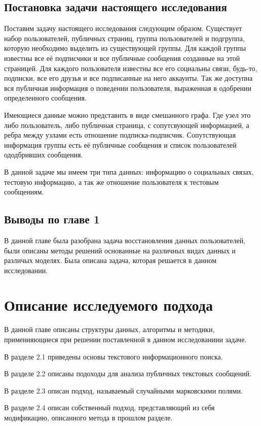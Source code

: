 \documentclass[annotation,times,page4]{itmo-student-thesis}
\begin{document}
\section{Постановка задачи настоящего исследования}
Поставим задачу настоящего исследования следующим образом. Существует набор пользователей, публичных страниц, группа пользователей и подгруппа, которую необходимо выделить из существующей группы. Для каждой группы известны все её подписчики и все публичные сообщения созданные на этой страницей. Для каждого пользователя известны все его социальны связи, будь-то, подписки, все его друзья и все подписанные на него аккаунты. Так же доступна вся публичная информация о поведении пользователя, выраженная в одобрении определенного сообщения.

Имеющиеся данные можно представить в виде смешанного графа. Где узел это либо пользователь, либо публичная страница, с сопутсвующей информацией, а ребра между узлами есть отношение подписка-подписчик. Сопутствующая информация группы есть её публичные сообщения и список пользователей ододбривших сообщения. 

В данной задаче мы имеем три типа данных: информацию о социальных связах, тестовую информацию, а так же отношение пользователя к тестовым сообщениям. 

\section{Выводы по главе 1}
В данной главе была разобрана задача восстановления данных пользователей, были описаны методы решений основанные на различных видах данных и различых моделях. Была описана задача, которая решается в данном исследовании.

\chapter{Описание исследуемого подхода}
В данной главе описаны структуры данных, алгоритмы и методики, применияющиеся при решении поставленной в данном исследованиии задаче.

В разделе 2.1 приведены основы текстового информационного поиска.

В разделе 2.2 описаны подоходы для анализа публичных текстовых сообщений.

В разделе 2.3 описан подход, называемый случайными марковскими полями.

В разделе 2.4 описан собственный подход, представляющий из себя модификацию, описанного метода в прошлом разделе. 
\end{document}
